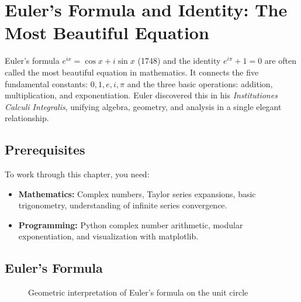 
\chapter{Euler's Formula and Identity: The Most Beautiful Equation}

\begin{historical}
Euler's formula $e^{ix} = \cos x + i\sin x$ (1748) and the identity $e^{i\pi} + 1 = 0$ are
often called the most beautiful equation in mathematics. It connects the five fundamental constants:
$0, 1, e, i, \pi$ and the three basic operations: addition, multiplication, and exponentiation.
Euler discovered this in his \emph{Institutiones Calculi Integralis}, unifying algebra, geometry,
and analysis in a single elegant relationship. \cite{euler1748}\end{historical}

\section{Prerequisites}

To work through this chapter, you need:
\begin{itemize}
    \item \textbf{Mathematics:} Complex numbers, Taylor series expansions, basic trigonometry, understanding of infinite series convergence.
    \item \textbf{Programming:} Python complex number arithmetic, modular exponentiation, and visualization with matplotlib.
\end{itemize}

\section{Euler's Formula}

\begin{figure}[H]
\centering
{}
\caption{Geometric interpretation of Euler's formula on the unit circle}
\label{fig:euler_formula}
\end{figure}

